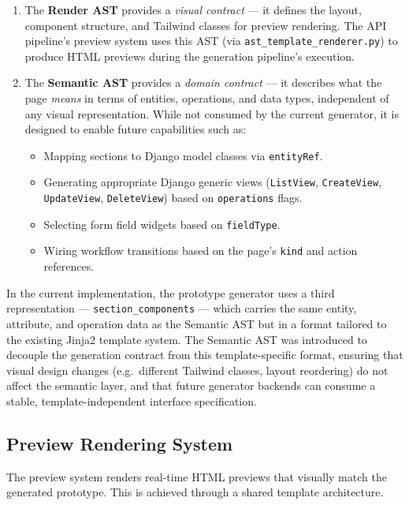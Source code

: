 \begin{enumerate}
    \item The \textbf{Render AST} provides a \emph{visual contract} — it defines the layout, component structure, and Tailwind classes for preview rendering. The API pipeline's preview system uses this AST (via \texttt{ast\_template\_renderer.py}) to produce HTML previews during the generation pipeline's execution.
    
    \item The \textbf{Semantic AST} provides a \emph{domain contract} — it describes what the page \emph{means} in terms of entities, operations, and data types, independent of any visual representation. While not consumed by the current generator, it is designed to enable future capabilities such as:
    \begin{itemize}
        \item Mapping sections to Django model classes via \texttt{entityRef}.
        \item Generating appropriate Django generic views (\texttt{ListView}, \texttt{CreateView}, \texttt{UpdateView}, \texttt{DeleteView}) based on \texttt{operations} flags.
        \item Selecting form field widgets based on \texttt{fieldType}.
        \item Wiring workflow transitions based on the page's \texttt{kind} and action references.
    \end{itemize}
\end{enumerate}

In the current implementation, the prototype generator uses a third representation — \texttt{section\_components} — which carries the same entity, attribute, and operation data as the Semantic AST but in a format tailored to the existing Jinja2 template system. The Semantic AST was introduced to decouple the generation contract from this template-specific format, ensuring that visual design changes (e.g.\ different Tailwind classes, layout reordering) do not affect the semantic layer, and that future generator backends can consume a stable, template-independent interface specification.


\subsection{Preview Rendering System}

The preview system renders real-time HTML previews that visually match the generated prototype. This is achieved through a shared template architecture.


